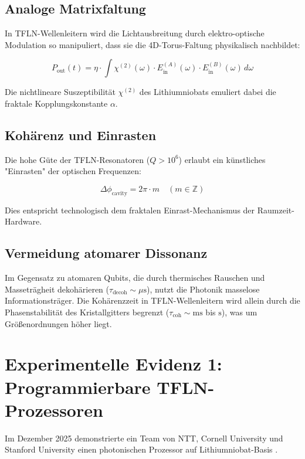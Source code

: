 	\subsection{Analoge Matrixfaltung}
	
	In TFLN-Wellenleitern wird die Lichtausbreitung durch elektro-optische Modulation so manipuliert, dass sie die 4D-Torus-Faltung physikalisch nachbildet:
	
	\begin{equation}
		P_{\text{out}}(t) = \eta \cdot \int \chi^{(2)}(\omega) \cdot E_{\text{in}}^{(A)}(\omega) \cdot E_{\text{in}}^{(B)}(\omega) \, d\omega
	\end{equation}
	
	Die nichtlineare Suszeptibilität $\chi^{(2)}$ des Lithiumniobats emuliert dabei die fraktale Kopplungskonstante $\alpha$.
	
	\subsection{Kohärenz und Einrasten}
	
	Die hohe Güte der TFLN-Resonatoren ($Q > 10^6$) erlaubt ein künstliches "Einrasten" der optischen Frequenzen:
	
	\begin{equation}
		\Delta \phi_{\text{cavity}} = 2\pi \cdot m \quad (m \in \mathbb{Z})
	\end{equation}
	
	Dies entspricht technologisch dem fraktalen Einrast-Mechanismus der Raumzeit-Hardware.
	
	\subsection{Vermeidung atomarer Dissonanz}
	
	Im Gegensatz zu atomaren Qubits, die durch thermisches Rauschen und Masseträgheit dekohärieren ($\tau_{\text{decoh}} \sim \mu\text{s}$), nutzt die Photonik masselose Informationsträger. Die Kohärenzzeit in TFLN-Wellenleitern wird allein durch die Phasenstabilität des Kristallgitters begrenzt ($\tau_{\text{coh}} \sim \text{ms}$ bis $\text{s}$), was um Größenordnungen höher liegt.
	
	\section{Experimentelle Evidenz 1: Programmierbare TFLN-Prozessoren}
	
	Im Dezember 2025 demonstrierte ein Team von NTT, Cornell University und Stanford University einen photonischen Prozessor auf Lithiumniobat-Basis \cite{NTT2025}.
	
